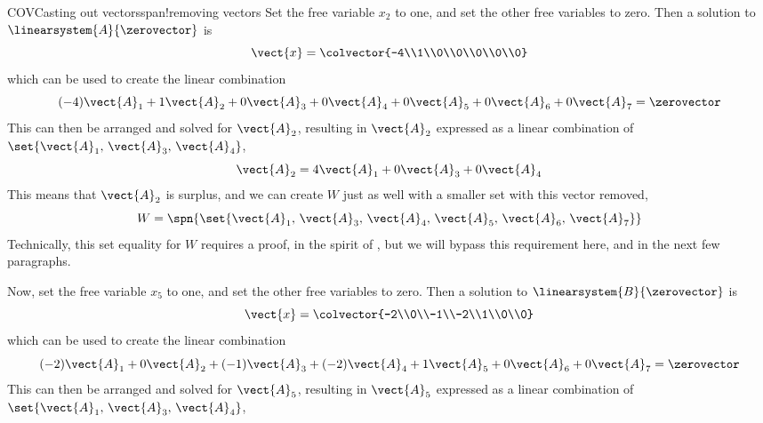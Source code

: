 \begin{example}{COV}{Casting out vectors}{span!removing vectors}
%
Set the free variable $x_2$ to one, and set the other free variables to zero.  Then a solution to $\linearsystem{A}{\zerovector}$ is
%
\begin{equation*}
\vect{x}=\colvector{-4\\1\\0\\0\\0\\0\\0}
\end{equation*}
%
which can be used to create the linear combination
%
\begin{equation*}
(-4)\vect{A}_1+
1\vect{A}_2+
0\vect{A}_3+
0\vect{A}_4+
0\vect{A}_5+
0\vect{A}_6+
0\vect{A}_7
=\zerovector
\end{equation*}
%
This can then be arranged and solved for $\vect{A}_2$, resulting in $\vect{A}_2$ expressed as a linear combination of $\set{\vect{A}_1,\,\vect{A}_3,\,\vect{A}_4}$,
%
\begin{equation*}
\vect{A}_2=
4\vect{A}_1+
0\vect{A}_3+
0\vect{A}_4
\end{equation*}
%
This means that $\vect{A}_2$ is surplus, and we can create $W$ just as well with a smaller set with  this vector removed,
%
\begin{equation*}
W=\spn{\set{\vect{A}_1,\,\vect{A}_3,\,\vect{A}_4,\,\vect{A}_5,\,\vect{A}_6,\,\vect{A}_7}}
\end{equation*}
%
Technically, this set equality for $W$ requires a proof, in the spirit of , but we will bypass this requirement here, and in the next few paragraphs.\par
%
Now, set the free variable $x_5$ to one, and set the other free variables to zero.  Then a solution to $\linearsystem{B}{\zerovector}$ is
%
\begin{equation*}
\vect{x}=\colvector{-2\\0\\-1\\-2\\1\\0\\0}
\end{equation*}
%
which can be used to create the linear combination
%
\begin{equation*}
(-2)\vect{A}_1+
0\vect{A}_2+
(-1)\vect{A}_3+
(-2)\vect{A}_4+
1\vect{A}_5+
0\vect{A}_6+
0\vect{A}_7
=\zerovector
\end{equation*}
%
This can then be arranged and solved for $\vect{A}_5$, resulting in $\vect{A}_5$ expressed as a linear combination of $\set{\vect{A}_1,\,\vect{A}_3,\,\vect{A}_4}$,

\end{example}
